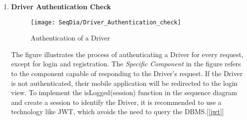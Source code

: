 \begin{enumerate}
    
    \item \textbf{Driver Authentication Check}
        \begin{figure}[H]
            \begin{center}
            \texttt{[image: SeqDia/Driver\_Authentication\_check]}
            \caption{Authentication of a Driver}
            \label{fig:DriverAuth}
            \end{center}
        \end{figure}
        The figure illustrates the process of authenticating a Driver for every request, except for login and registration. The \textit{Specific Component} in the figure refers to the component capable of responding to the Driver's request. If the Driver is not authenticated, their mobile application will be redirected to the login view. To implement the isLogged(session) function in the sequence diagram and create a session to identify the Driver, it is recommended to use a technology like JWT, which avoids the need to query the DBMS.[\ref{jwt}]\\
        

\end{enumerate}

